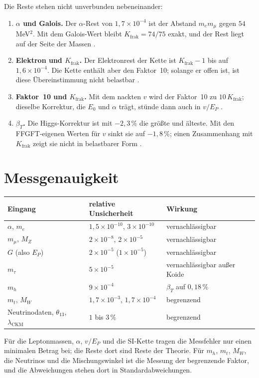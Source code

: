 Die Reste stehen nicht unverbunden nebeneinander:
\begin{enumerate}[leftmargin=*,itemsep=2pt]
\item \textbf{$\alpha$ und Galois.} Der $\alpha$-Rest von $1{,}7\times10^{-4}$ ist der Abstand
  $m_em_\mu$ gegen $54$\,MeV$^2$. Mit dem Galois-Wert bleibt $K_{\text{frak}}=74/75$ exakt, und der
  Rest liegt auf der Seite der Massen \KM.
\item \textbf{Elektron und $K_{\text{frak}}$.} Der Elektronrest der Kette ist $K_{\text{frak}}-1$
  bis auf $1{,}6\times10^{-4}$. Die Kette enthält aber den Faktor~10; solange er offen ist, ist
  diese Übereinstimmung nicht belastbar \SM.
\item \textbf{Faktor~10 und $K_{\text{frak}}$.} Mit dem nackten $v$ wird der Faktor~10 zu
  $10\,K_{\text{frak}}$; dieselbe Korrektur, die $E_0$ und $\alpha$ trägt, stünde dann auch in
  $v/E_P$ \SM.
\item \textbf{$\beta_T$.} Die Higgs-Korrektur ist mit $-2{,}3\,\%$ die größte und älteste. Mit den
  FFGFT-eigenen Werten für $v$ sinkt sie auf $-1{,}8\,\%$; einen Zusammenhang mit
  $K_{\text{frak}}$ zeigt sie nicht in belastbarer Form \SM.
\end{enumerate}

\section{Messgenauigkeit}

\begin{center}
\small
\begin{tabular}{@{}lll@{}}
\toprule
\textbf{Eingang} & \textbf{relative Unsicherheit} & \textbf{Wirkung} \\
\midrule
$\alpha$, $m_e$ & $1{,}5\times10^{-10}$, $3\times10^{-10}$ & vernachlässigbar \\
$m_\mu$, $M_Z$ & $2\times10^{-8}$, $2\times10^{-5}$ & vernachlässigbar \\
$G$ (also $E_P$) & $2\times10^{-5}$ ($1\times10^{-5}$) & vernachlässigbar \\
$m_\tau$ & $5\times10^{-5}$ & vernachlässigbar außer Koide \\
$m_h$ & $9\times10^{-4}$ & $\beta_T$ auf $0{,}18\,\%$ \\
$m_t$, $M_W$ & $1{,}7\times10^{-3}$, $1{,}7\times10^{-4}$ & begrenzend \\
Neutrinodaten, $\theta_{13}$, $\lambda_{\text{CKM}}$ & $1$ bis $3\,\%$ & begrenzend \\
\bottomrule
\end{tabular}
\end{center}
Für die Leptonmassen, $\alpha$, $v/E_P$ und die SI-Kette tragen die Messfehler nur einen minimalen
Betrag bei; die Reste dort sind Reste der Theorie. Für $m_h$, $m_t$, $M_W$, die Neutrinos und die
Mischungswinkel ist die Messung der begrenzende Faktor, und die Abweichungen stehen dort in
Standardabweichungen.

